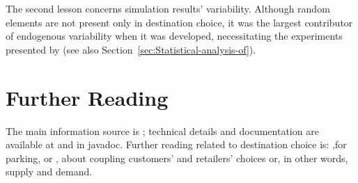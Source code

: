 The second lesson concerns simulation results' variability. 
Although random elements are not present only in destination choice, it was the largest contributor of endogenous variability when it was developed, necessitating the experiments presented by \citet[][]{HorniEtAl_TechRep_IVT_2011_b} (see also Section~\ref{sec:Statistical-analysis-of}).

\section{Further Reading}
The main information source is \citet[][]{HorniEtAl_unpub_TRB_2012, Horni_PhDThesis_2013}; 
technical details and documentation are available at \citet[][]{MATSIM-DC_Webpage_2015} and in \gls{javadoc}. 
Further reading related to destination choice is: \citet[][]{HorniEtAl_IATBRspec_2013},for parking, or \citet[][]{HorniEtAl_TechRep_IVT_2012}, about coupling customers' and retailers' choices or, in other words, supply and demand.

